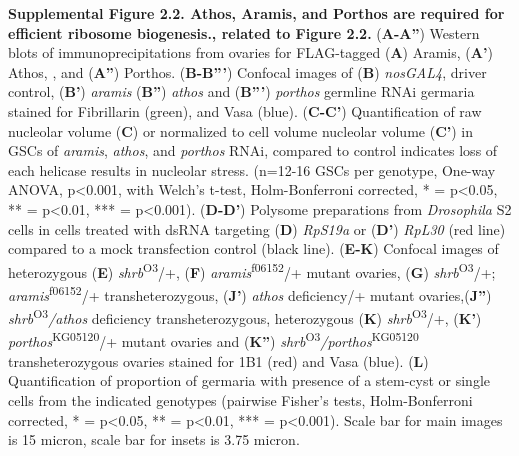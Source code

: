 \documentclass[12pt,twoside]{reedthesis}
\begin{document}
\textbf{Supplemental Figure 2.2. Athos, Aramis, and Porthos are required for
efficient ribosome biogenesis., related to Figure 2.2.} (\textbf{A-A''})
Western blots of immunoprecipitations from ovaries for FLAG-tagged
(\textbf{A}) Aramis, (\textbf{A'}) Athos, , and (\textbf{A''}) Porthos. (\textbf{B-B'''})
Confocal images of (\textbf{B}) \emph{nosGAL4}, driver control, (\textbf{B'}) \emph{aramis}
(\textbf{B''}) \emph{athos} and (\textbf{B'''}) \emph{porthos} germline RNAi germaria
stained for Fibrillarin (green), and Vasa (blue). (\textbf{C-C'})
Quantification of raw nucleolar volume (\textbf{C}) or normalized to cell
volume nucleolar volume (\textbf{C'}) in GSCs of \emph{aramis}, \emph{athos}, and
\emph{porthos} RNAi, compared to control indicates loss of each helicase
results in nucleolar stress. (n=12-16 GSCs per genotype, One-way ANOVA,
p\textless0.001, with Welch's t-test, Holm-Bonferroni corrected, * = p\textless0.05,
** = p\textless0.01, *** = p\textless0.001). (\textbf{D-D'}) Polysome preparations
from \emph{Drosophila} S2 cells in cells treated with dsRNA targeting (\textbf{D})
\emph{RpS19a} or (\textbf{D'}) \emph{RpL30} (red line) compared to a mock transfection
control (black line). (\textbf{E-K}) Confocal images of heterozygous (\textbf{E})
\emph{shrb}\textsuperscript{O3}/+, (\textbf{F}) \emph{aramis}\textsuperscript{f06152}/+ mutant ovaries, (\textbf{G})
\emph{shrb}\textsuperscript{O3}/+; \emph{aramis}\textsuperscript{f06152}/+ transheterozygous, (\textbf{J'}) \emph{athos}
deficiency/+ mutant ovaries,(\textbf{J''}) \emph{shrb}\textsuperscript{O3}\emph{/athos} deficiency
transheterozygous, heterozygous (\textbf{K}) \emph{shrb}\textsuperscript{O3}/+, (\textbf{K'})
\emph{porthos}\textsuperscript{KG05120}/+ mutant ovaries and (\textbf{K''})
\emph{shrb}\textsuperscript{O3}\emph{/porthos}\textsuperscript{KG05120} transheterozygous ovaries stained for 1B1
(red) and Vasa (blue). (\textbf{L}) Quantification of proportion of germaria
with presence of a stem-cyst or single cells from the indicated
genotypes (pairwise Fisher's tests, Holm-Bonferroni corrected, * =
p\textless0.05, ** = p\textless0.01, *** = p\textless0.001). Scale bar for main images
is 15 micron, scale bar for insets is 3.75 micron.

\textbf{\hfill\break
}
\end{document}
